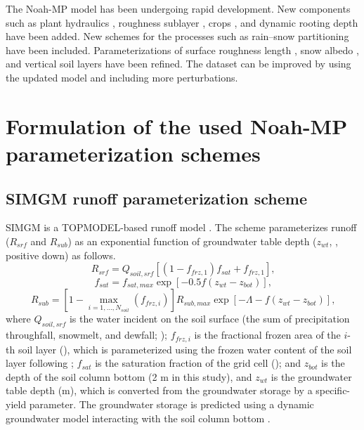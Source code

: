 \documentclass[essd, manuscript]{copernicus}
\let\unit\undefined
\begin{document}
The Noah-MP model has been undergoing rapid development. New components such as plant hydraulics \citep{li2021JAMESa}, roughness sublayer \citep{abolafia-rosenzweig2021JAMES}, crops \citep{liu2016JGRA}, and dynamic rooting depth \citep{liu2020JAMES} have been added. New schemes for the processes such as rain--snow partitioning \citep{wang2019GRL} have been included. Parameterizations of surface roughness length \citep{he2019JGRA, zhang2021IJC}, snow albedo \citep{wang2020JHd}, and vertical soil layers \citep{zhao2022ITGRS,shellito2020JH} have been refined. The dataset can be improved by using the updated model and including more perturbations.

\appendix

\section{Formulation of the used Noah-MP parameterization schemes}\label{sec:app:noahmp}

\subsection{SIMGM runoff parameterization scheme}\label{sec:app:noahmp:simgm}

SIMGM is a TOPMODEL-based runoff model \citep{niu2007JGRa}. The scheme parameterizes runoff (\(R_{srf}\) and \(R_{sub}\)) as an exponential function of groundwater table depth (\(z_{wt}\), \unit{m}, positive down) as follows.
\begin{equation}
  R_{srf} = Q_{soil,srf} [(1 - f_{frz,1}) f_{sat} + f_{frz,1} ]
  \text{,} \label{eq:simgm:rsrf}
\end{equation}
\begin{equation}
  f_{sat} = f_{sat,max} \exp[-0.5 f (z_{wt} - z_{bot})]
  \text{,} \label{eq:simgm:fsat}
\end{equation}
\begin{equation}
  R_{sub} = [1 - \max_{i=1,\dots,N_{soil}} (f_{frz,i})] R_{sub,max}
  \exp[-\Lambda - f(z_{wt} - z_{bot})]
  \text{,} \label{eq:simgm:rsub}
\end{equation}
where \(Q_{soil,srf}\) is the water incident on the soil surface (the sum of precipitation throughfall, snowmelt, and dewfall; \unit{kg.m^{-2}.s^{-1}}); \(f_{frz,i}\) is the fractional frozen area of the \(i\)-th soil layer (\unit{m^2.m^{-2}}), which is parameterized using the frozen water content of the soil layer following \citet{niu2006JH}; \(f_{sat}\) is the saturation fraction of the grid cell (\unit{m^2.m^{-2}}); and \(z_{bot}\) is the depth of the soil column bottom (2 m in this study), and \(z_{wt}\) is the groundwater table depth (m), which is converted from the groundwater storage by a specific-yield parameter. The groundwater storage is predicted using a dynamic groundwater model interacting with the soil column bottom \citep{niu2007JGRa}.
\end{document}

